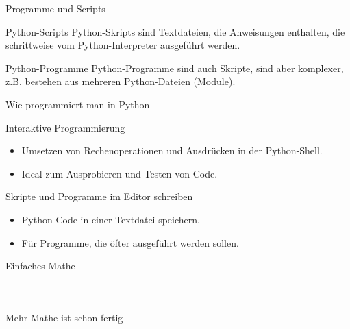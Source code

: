 \documentclass[xelatex,aspectratio=169]{beamer}
\begin{document}
\begin{frame}{Programme und Scripts}
  \begin{block}{Python-Scripts}
    Python-Skripts sind Textdateien, die Anweisungen enthalten,
    die schrittweise vom Python-Interpreter ausgeführt werden.
  \end{block}

  \begin{block}{Python-Programme}
    Python-Programme sind auch Skripte, sind aber komplexer,
    z.B. bestehen aus mehreren Python-Dateien (Module).
  \end{block}
\end{frame}

\begin{frame}{Wie programmiert man in Python}
  \begin{block}{Interaktive Programmierung}
    \begin{itemize}
      \item Umsetzen von Rechenoperationen und Ausdrücken in der Python-Shell.
      \item Ideal zum Ausprobieren und Testen von Code.
    \end{itemize}
  \end{block}
  \begin{block}{Skripte und Programme im Editor schreiben}
    \begin{itemize}
      \item Python-Code in einer Textdatei speichern.
      \item Für Programme, die öfter ausgeführt werden sollen.
    \end{itemize}
  \end{block}
\end{frame}

\begin{frame}{Einfaches Mathe}
  \begin{columns}
    \begin{column}{.25\linewidth}
      \inputminted{python}{src/math_example.py}
    \end{column}
    \begin{column}{.8\linewidth}
      \inputminted{console}{src/math_example_interactive}
    \end{column}
  \end{columns}
\end{frame}

\begin{frame}{Mehr Mathe ist schon fertig}
  \inputminted{python}{src/math_libraries.py}
\end{frame}
\end{document}
